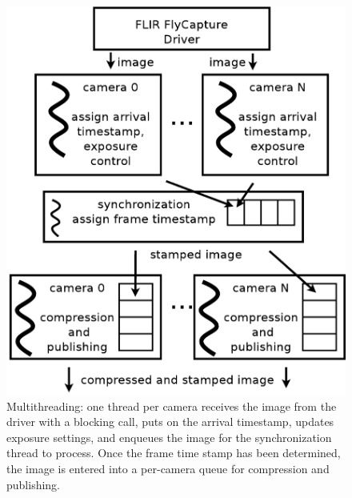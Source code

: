 \label{sec:multithreading}
\begin{figure}[ht]
	\centering
	\includegraphics[width=\linewidth]{figures/threading.pdf}
        \caption{Multithreading: one thread per camera receives the
          image from the driver with a blocking call, puts on the
          arrival timestamp, updates exposure settings, and enqueues
          the image for the synchronization thread to process. Once
          the frame time stamp has been determined, the image is
          entered into a per-camera queue for compression and publishing.}
    \label{fig:multithreading}
\end{figure}
